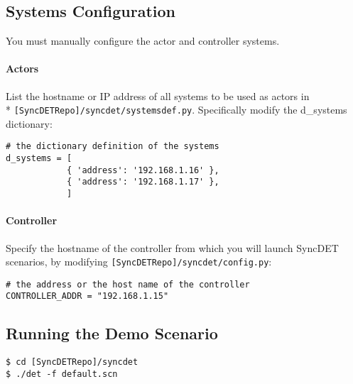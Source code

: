 \subsection{Systems Configuration}
You must manually configure the actor and controller systems. 

\paragraph{Actors} 
List the hostname or IP address of all systems to be used as actors in \\*
{\tt [SyncDETRepo]/syncdet/systemsdef.py}. Specifically modify the d\_systems
dictionary:
\begin{verbatim}
# the dictionary definition of the systems
d_systems = [
            { 'address': '192.168.1.16' },
            { 'address': '192.168.1.17' },
            ]
\end{verbatim}

\paragraph{Controller} 
Specify the hostname of the controller from which you will launch
SyncDET scenarios, by modifying {\tt [SyncDETRepo]/syncdet/config.py}:
\begin{verbatim}
# the address or the host name of the controller
CONTROLLER_ADDR = "192.168.1.15"
\end{verbatim}

\subsection{Running the Demo Scenario}
\begin{verbatim}
$ cd [SyncDETRepo]/syncdet
$ ./det -f default.scn
\end{verbatim}

